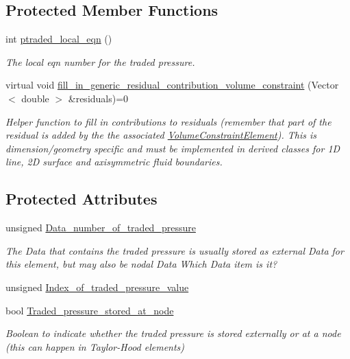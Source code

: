 \subsection*{Protected Member Functions}
\begin{DoxyCompactItemize}
\item 
int \hyperlink{classoomph_1_1VolumeConstraintBoundingElement_ae5262edeb9cd3bcbc1ae4265b08c7f07}{ptraded\+\_\+local\+\_\+eqn} ()
\begin{DoxyCompactList}\small\item\em The local eqn number for the traded pressure. \end{DoxyCompactList}\item 
virtual void \hyperlink{classoomph_1_1VolumeConstraintBoundingElement_a717f1085709bd8820b8043ff94ecb0c5}{fill\+\_\+in\+\_\+generic\+\_\+residual\+\_\+contribution\+\_\+volume\+\_\+constraint} (Vector$<$ double $>$ \&residuals)=0
\begin{DoxyCompactList}\small\item\em Helper function to fill in contributions to residuals (remember that part of the residual is added by the the associated \hyperlink{classoomph_1_1VolumeConstraintElement}{Volume\+Constraint\+Element}). This is dimension/geometry specific and must be implemented in derived classes for 1D line, 2D surface and axisymmetric fluid boundaries. \end{DoxyCompactList}\end{DoxyCompactItemize}
\subsection*{Protected Attributes}
\begin{DoxyCompactItemize}
\item 
unsigned \hyperlink{classoomph_1_1VolumeConstraintBoundingElement_afd35462188f27b6851416ab49ec5df5a}{Data\+\_\+number\+\_\+of\+\_\+traded\+\_\+pressure}
\begin{DoxyCompactList}\small\item\em The Data that contains the traded pressure is usually stored as external Data for this element, but may also be nodal Data Which Data item is it? \end{DoxyCompactList}\item 
unsigned \hyperlink{classoomph_1_1VolumeConstraintBoundingElement_a40f5ebebeaf633515951a2d08060ec15}{Index\+\_\+of\+\_\+traded\+\_\+pressure\+\_\+value}
\item 
bool \hyperlink{classoomph_1_1VolumeConstraintBoundingElement_a8f9aa94f106fd443fa690851a0268720}{Traded\+\_\+pressure\+\_\+stored\+\_\+at\+\_\+node}
\begin{DoxyCompactList}\small\item\em Boolean to indicate whether the traded pressure is stored externally or at a node (this can happen in Taylor-\/\+Hood elements) \end{DoxyCompactList}\end{DoxyCompactItemize}


